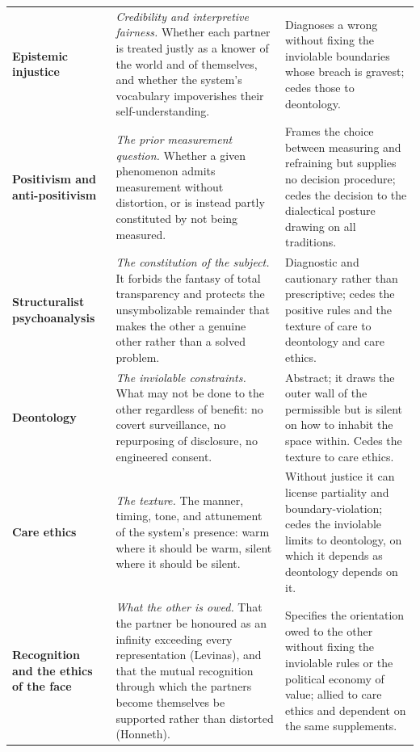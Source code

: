 \begin{small}
\begin{longtable}{@{}>{\raggedright\arraybackslash}p{} >{\raggedright\arraybackslash}p{} >{\raggedright\arraybackslash}p{}@{}}
\textbf{Epistemic injustice} \parencite{fricker2007epistemic} & \emph{Credibility and interpretive fairness.} Whether each partner is treated justly as a knower of the world and of themselves, and whether the system's vocabulary impoverishes their self-understanding. & Diagnoses a wrong without fixing the inviolable boundaries whose breach is gravest; cedes those to deontology.\\

\textbf{Positivism and anti-positivism} \parencite{dilthey1989introduction, weber1978economy, geertz1973interpretation} & \emph{The prior measurement question.} Whether a given phenomenon admits measurement without distortion, or is instead partly constituted by not being measured. & Frames the choice between measuring and refraining but supplies no decision procedure; cedes the decision to the dialectical posture drawing on all traditions.\\

\textbf{Structuralist psychoanalysis} \parencite{saussure1916course, lacan2006ecrits, lacan1977four, zizek1989sublime} & \emph{The constitution of the subject.} It forbids the fantasy of total transparency and protects the unsymbolizable remainder that makes the other a genuine other rather than a solved problem. & Diagnostic and cautionary rather than prescriptive; cedes the positive rules and the texture of care to deontology and care ethics.\\

\textbf{Deontology} \parencite{kant1785groundwork} & \emph{The inviolable constraints.} What may not be done to the other regardless of benefit: no covert surveillance, no repurposing of disclosure, no engineered consent. & Abstract; it draws the outer wall of the permissible but is silent on how to inhabit the space within. Cedes the texture to care ethics.\\

\textbf{Care ethics} \parencite{gilligan1982voice, noddings1984caring, held2006ethics, tronto1993moral} & \emph{The texture.} The manner, timing, tone, and attunement of the system's presence: warm where it should be warm, silent where it should be silent. & Without justice it can license partiality and boundary-violation; cedes the inviolable limits to deontology, on which it depends as deontology depends on it.\\

\textbf{Recognition and the ethics of the face} \parencite{levinas1969totality, honneth1995struggle} & \emph{What the other is owed.} That the partner be honoured as an infinity exceeding every representation (Levinas), and that the mutual recognition through which the partners become themselves be supported rather than distorted (Honneth). & Specifies the orientation owed to the other without fixing the inviolable rules or the political economy of value; allied to care ethics and dependent on the same supplements.\\


\end{longtable}
\end{small}

